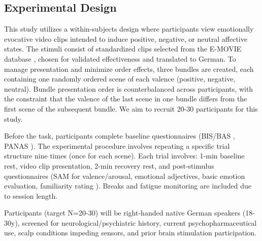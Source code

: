 \documentclass[12pt]{article} %
\begin{document}
\subsection{Experimental Design} %
This study utilizes a within-subjects design where participants view emotionally evocative video clips intended to induce positive, negative, or neutral affective states. The stimuli consist of standardized clips selected from the E-MOVIE database \parencite{maffeiEMOVIEExperimentalMOVies2019}, chosen for validated effectiveness and translated to German. To manage presentation and minimize order effects, three bundles are created, each containing one randomly ordered scene of each valence (positive, negative, neutral). Bundle presentation order is counterbalanced across participants, with the constraint that the valence of the last scene in one bundle differs from the first scene of the subsequent bundle. We aim to recruit 20-30 participants for this study.

Before the task, participants complete baseline questionnaires (\gls{BIS}/\gls{BAS} \parencite{carverBehavioralInhibitionBehavioral1994, strobelDeutschsprachigeVersionBIS2006}, \gls{PANAS} \parencite{watsonDevelopmentValidationBrief1988,breyerDeutscheVersionPositive2016}). The experimental procedure involves repeating a specific trial structure nine times (once for each scene). Each trial involves: 1-min baseline rest, video clip presentation, 2-min recovery rest, and post-stimulus questionnaires (\gls{SAM} for valence/arousal, emotional adjectives, basic emotion evaluation, familiarity rating \parencite{maffeiEMOVIEExperimentalMOVies2019}). Breaks and fatigue monitoring are included due to session length.

Participants (target N=20-30) will be right-handed native German speakers (18-30y), screened for neurological/psychiatric history, current psychopharmaceutical use, scalp conditions impeding sensors, and prior brain stimulation participation.
\end{document}
